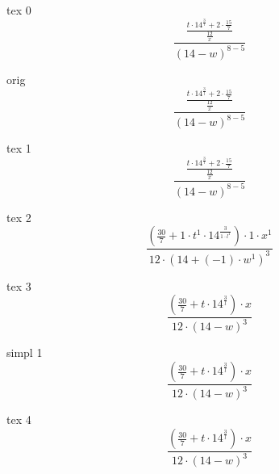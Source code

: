 \documentclass[a4paper, 12pt]{article}
\begin{document}
                          
tex 0 \[  \frac { \frac {{{{t} \cdot {{14} ^  \frac {{3}} {{l}}}} + {{2} \cdot  \frac {{15}} {{7}}}}} { \frac {{12}} {{x}}}} {{\left({{14} - {w}}\right) ^ {{8} - {5}}}} \]

orig \[  \frac { \frac {{{{t} \cdot {{14} ^  \frac {{3}} {{l}}}} + {{2} \cdot  \frac {{15}} {{7}}}}} { \frac {{12}} {{x}}}} {{\left({{14} - {w}}\right) ^ {{8} - {5}}}} \]

tex 1 \[  \frac { \frac {{{{t} \cdot {{14} ^  \frac {{3}} {{l}}}} + {{2} \cdot  \frac {{15}} {{7}}}}} { \frac {{12}} {{x}}}} {{\left({{14} - {w}}\right) ^ {{8} - {5}}}} \]

tex 2 \[  \frac {{\left({ \frac {{30}} {{7}} + {{{1} \cdot {{t} ^ {1}}} \cdot {{14} ^  \frac {{3}} {{{1} \cdot {{l} ^ {1}}}}}}}\right) \cdot {{1} \cdot {{x} ^ {1}}}}} {{{12} \cdot {\left({{14} + {\left({-1}\right) \cdot {{w} ^ {1}}}}\right) ^ {3}}}} \]

tex 3 \[  \frac {{\left({ \frac {{30}} {{7}} + {{t} \cdot {{14} ^  \frac {{3}} {{l}}}}}\right) \cdot {x}}} {{{12} \cdot {\left({{14} - {w}}\right) ^ {3}}}} \]

simpl 1 \[  \frac {{\left({ \frac {{30}} {{7}} + {{t} \cdot {{14} ^  \frac {{3}} {{l}}}}}\right) \cdot {x}}} {{{12} \cdot {\left({{14} - {w}}\right) ^ {3}}}} \]

tex 4 \[  \frac {{\left({ \frac {{30}} {{7}} + {{t} \cdot {{14} ^  \frac {{3}} {{l}}}}}\right) \cdot {x}}} {{{12} \cdot {\left({{14} - {w}}\right) ^ {3}}}} \]
\end{document}

